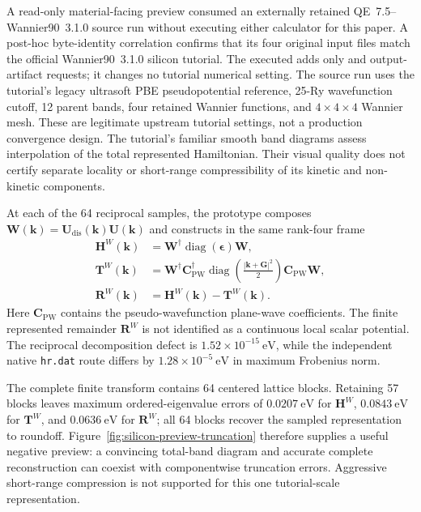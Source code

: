 \documentclass[preprint,12pt]{elsarticle}
\begin{document}
A read-only material-facing preview consumed an externally retained
QE~7.5--Wannier90~3.1.0 source run without executing either calculator for this
paper. A post-hoc byte-identity correlation confirms that its four original
input files match the official Wannier90~3.1.0
 silicon tutorial. The executed 
adds only  and  output-artifact
requests; it changes no tutorial numerical setting. The source run uses the
tutorial's legacy ultrasoft PBE pseudopotential reference, 25-Ry wavefunction cutoff,
12 parent bands, four retained Wannier functions, and
$4\times4\times4$ Wannier mesh. These are legitimate upstream tutorial
settings, not a production convergence design. The tutorial's familiar smooth
band diagrams assess interpolation of the total represented Hamiltonian. Their
visual quality does not certify separate locality or short-range
compressibility of its kinetic and non-kinetic components.

At each of the 64 reciprocal samples, the prototype composes
$\bm{W}(\bm{k})=\bm{U}_{\mathrm{dis}}(\bm{k})\bm{U}(\bm{k})$ and constructs
in the same rank-four frame
\begin{align}
 \bm{H}^{W}(\bm{k})
 &=\bm{W}^{\dagger}\operatorname{diag}(\bm{\epsilon})\bm{W},\nonumber\\
 \bm{T}^{W}(\bm{k})
 &=\bm{W}^{\dagger}\bm{C}_{\mathrm{PW}}^{\dagger}
   \operatorname{diag}\!\left(\frac{|\bm{k}+\bm{G}|^2}{2}\right)
   \bm{C}_{\mathrm{PW}}\bm{W},\nonumber\\
 \bm{R}^{W}(\bm{k})
 &=\bm{H}^{W}(\bm{k})-\bm{T}^{W}(\bm{k}).
 \label{eq:silicon-preview-decomposition}
\end{align}
Here $\bm{C}_{\mathrm{PW}}$ contains the pseudo-wavefunction plane-wave
coefficients. The finite represented remainder $\bm{R}^{W}$ is not identified
as a continuous local scalar potential. The reciprocal decomposition defect is
$1.52\times10^{-15}\ \mathrm{eV}$, while the independent native
\texttt{hr.dat} route differs by $1.28\times10^{-5}\ \mathrm{eV}$ in maximum
Frobenius norm.

The complete finite transform contains 64 centered lattice blocks. Retaining
57 blocks leaves maximum ordered-eigenvalue errors of $0.0207\ \mathrm{eV}$
for $\bm{H}^{W}$, $0.0843\ \mathrm{eV}$ for $\bm{T}^{W}$, and
$0.0636\ \mathrm{eV}$ for $\bm{R}^{W}$; all 64 blocks recover the sampled
representation to roundoff. Figure~\ref{fig:silicon-preview-truncation}
therefore supplies a useful negative preview: a convincing total-band diagram
and accurate complete reconstruction can coexist with componentwise truncation
errors. Aggressive short-range compression is not supported for this one
tutorial-scale representation.
\end{document}
